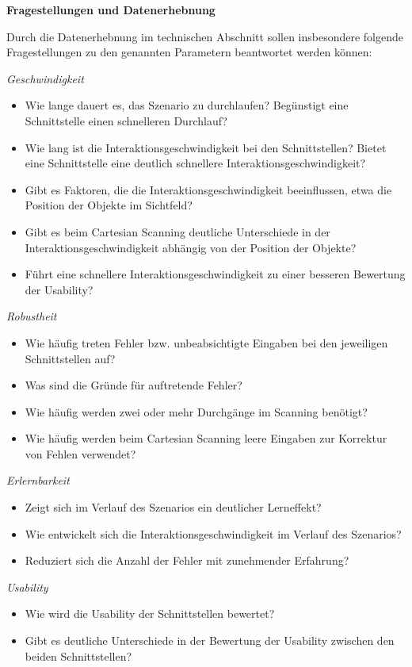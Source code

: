 \textbf{Fragestellungen und Datenerhebnung}

Durch die Datenerhebnung im technischen Abschnitt sollen insbesondere folgende Fragestellungen zu den genannten Parametern beantwortet werden können:

\textit{Geschwindigkeit} 
    \begin{itemize}
        \item Wie lange dauert es, das Szenario zu durchlaufen? Begünstigt eine Schnittstelle einen schnelleren Durchlauf?
        \item Wie lang ist die Interaktionsgeschwindigkeit bei den Schnittstellen? Bietet eine Schnittstelle eine deutlich schnellere Interaktionsgeschwindigkeit?
        \item Gibt es Faktoren, die die Interaktionsgeschwindigkeit beeinflussen, etwa die Position der Objekte im Sichtfeld?
        \item Gibt es beim Cartesian Scanning deutliche Unterschiede in der Interaktionsgeschwindigkeit abhängig von der Position der Objekte?
        \item Führt eine schnellere Interaktionsgeschwindigkeit zu einer besseren Bewertung der Usability? 
    \end{itemize}
\textit{Robustheit}
    \begin{itemize}
        \item  Wie häufig treten Fehler bzw. unbeabsichtigte Eingaben bei den jeweiligen Schnittstellen auf? 
        \item Was sind die Gründe für auftretende Fehler?
        \item Wie häufig werden zwei oder mehr Durchgänge im Scanning benötigt?
        \item Wie häufig werden beim Cartesian Scanning leere Eingaben zur Korrektur von Fehlen verwendet? 
    \end{itemize}
\textit{Erlernbarkeit}
    \begin{itemize}
        \item Zeigt sich im Verlauf des Szenarios ein deutlicher Lerneffekt? 
        \item Wie entwickelt sich die Interaktionsgeschwindigkeit im Verlauf des Szenarios? 
        \item Reduziert sich die Anzahl der Fehler mit zunehmender Erfahrung?
    \end{itemize}
\textit{Usability}
    \begin{itemize}
    \item Wie wird die Usability der Schnittstellen bewertet?
    \item Gibt es deutliche Unterschiede in der Bewertung der Usability zwischen den beiden Schnittstellen? 
    \end{itemize}

